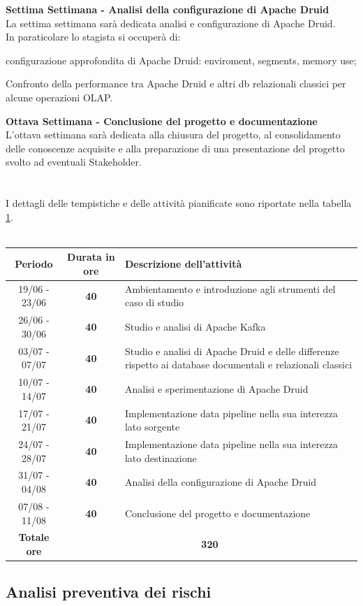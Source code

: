 \noindent \textbf{Settima Settimana - Analisi della configurazione di Apache Druid}\\
La settima settimana sarà dedicata analisi e configurazione di Apache Druid. \\
In paraticolare lo stagista si occuperà di:
\begin{list}{*}{}
    \item configurazione approfondita di Apache Druid: enviroment, segments, memory use;
    \item Confronto della performance tra Apache Druid e altri db relazionali classici per alcune operazioni
    OLAP.
\end{list}
\textbf{Ottava Settimana - Conclusione del progetto e documentazione}\\
L'ottava settimana sarà dedicata alla chiusura del progetto, al consolidamento delle conoscenze acquisite e alla preparazione 
di una presentazione del progetto svolto ad eventuali Stakeholder. \\
\\
\\
I dettagli delle tempistiche e delle attività pianificate sono riportate nella tabella \ref{tab:Tabella3}.\\\\
\begin{table}[h]
    \label{tab:Tabella3}
\begin{tabularx}{\textwidth}{|c|c|X|}
	\hline
	\textbf{Periodo} & \textbf{Durata in ore} & \textbf{Descrizione dell'attività} \\\hline
	19/06 - 23/06 & \textbf{40} & Ambientamento e introduzione agli strumenti del caso di studio \\ \hline
    26/06 - 30/06 & \textbf{40} & Studio e analisi di Apache Kafka \\ \hline
    03/07 - 07/07 & \textbf{40} & Studio e analisi di Apache Druid e delle differenze rispetto ai database documentali e relazionali classici  \\ \hline
    10/07 - 14/07 & \textbf{40} & Analisi e sperimentazione di Apache Druid \\ \hline
    17/07 - 21/07 & \textbf{40} & Implementazione data pipeline nella sua interezza lato sorgente \\ \hline
    24/07 - 28/07 & \textbf{40} & Implementazione data pipeline nella sua interezza lato destinazione \\ \hline
    31/07 - 04/08 & \textbf{40} & Analisi della configurazione di Apache Druid \\ \hline
	07/08 - 11/08 & \textbf{40} & Conclusione del progetto e documentazione \\\hline
	\textbf{Totale ore} & \multicolumn{2}{|c|}{\textbf{320}} \\\hline
\end{tabularx}
\end{table}

\subsection{Analisi preventiva dei rischi}


